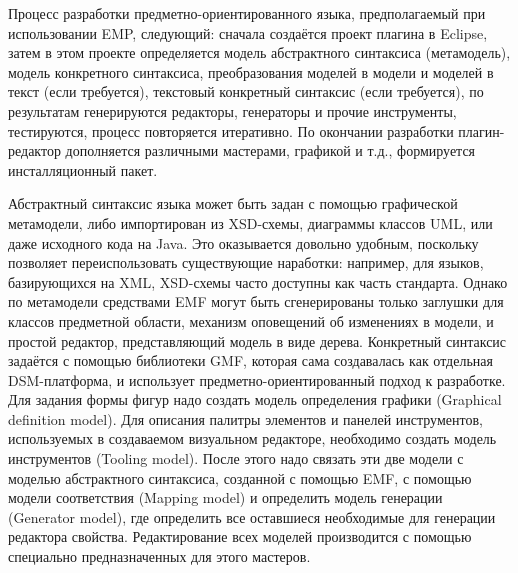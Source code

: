 Процесс разработки предметно-ориентированного языка, предполагаемый при использовании EMP, 
следующий: сначала создаётся проект плагина в Eclipse, затем в этом проекте определяется 
модель абстрактного синтаксиса (метамодель), модель конкретного синтаксиса, преобразования 
моделей в модели и моделей в текст (если требуется), текстовый конкретный синтаксис 
(если требуется), по результатам генерируются редакторы, генераторы и прочие инструменты, 
тестируются, процесс повторяется итеративно. По окончании разработки плагин-редактор 
дополняется различными мастерами, графикой и т.д., формируется инсталляционный пакет.

Абстрактный синтаксис языка может быть задан с помощью графической метамодели, либо 
импортирован из XSD-схемы, диаграммы классов UML, или даже исходного кода на Java. 
Это оказывается довольно удобным, поскольку позволяет переиспользовать существующие 
наработки: например, для языков, базирующихся на XML, XSD-схемы часто доступны как 
часть стандарта. Однако по метамодели средствами EMF могут быть сгенерированы только 
заглушки для классов предметной области, механизм оповещений об изменениях в модели, 
и простой редактор, представляющий модель в виде дерева. Конкретный синтаксис задаётся
с помощью библиотеки GMF, которая сама создавалась как отдельная DSM-платформа, и использует 
предметно-ориентированный подход к разработке. Для задания формы фигур надо создать 
модель определения графики (Graphical definition model). Для описания палитры элементов 
и панелей инструментов, используемых в создаваемом визуальном редакторе, необходимо 
создать модель инструментов (Tooling model). После этого надо связать эти две модели 
с моделью абстрактного синтаксиса, созданной с помощью EMF, с помощью модели соответствия 
(Mapping model) и определить модель генерации (Generator model), где определить все 
оставшиеся необходимые для генерации редактора свойства. Редактирование всех моделей 
производится с помощью специально предназначенных для этого мастеров.

